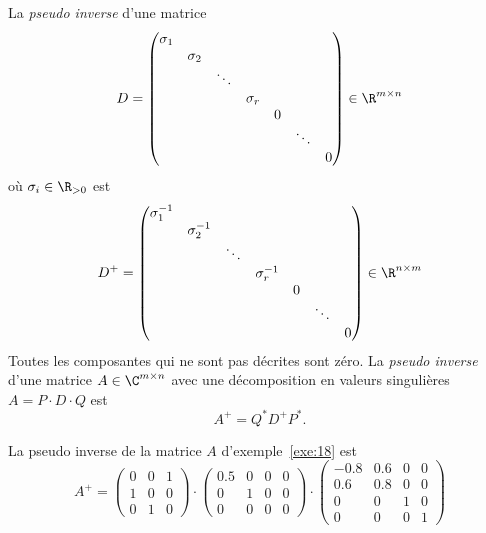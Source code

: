 \begin{definition}
  La \emph{pseudo inverse} d'une matrice 
  \begin{displaymath}
    D =
    \begin{pmatrix}
      \sigma_1 \\
      & \sigma_2 \\
      & & \ddots \\
      & & & \sigma_r \\
      & & & & 0 \\
      & & & & & \ddots  \\
      & & & & & & 0  \\      
    \end{pmatrix}
    \in \R^{m \times n}
  \end{displaymath}
où $\sigma_i \in \R_{>0}$ est 
\begin{displaymath}
  D^+ =  \begin{pmatrix}
      \sigma_1^{-1} \\
      & \sigma_2^{-1} \\
      & & \ddots \\
      & & & \sigma_r^{-1} \\
      & & & & 0 \\
      & & & & & \ddots  \\
      & & & & & & 0  \\      
    \end{pmatrix}
    \in \R^{n \times m}
\end{displaymath}
Toutes les composantes qui ne sont pas décrites sont zéro. 
La \emph{pseudo inverse} d'une matrice $A \in \C^{m \times n}$ avec une décomposition en valeurs singulières $A = P \cdot D \cdot Q$ est 
\begin{displaymath}
  A^+ = Q^* D^+ P^*. 
\end{displaymath}

\end{definition}


\begin{example}
  La pseudo inverse de la matrice $A$ d'exemple~\ref{exe:18} est 
  \begin{displaymath}
    A^+ = 
\begin{pmatrix}0 & 0 & 1\\1 & 0 & 0\\0 & 1 & 0\end{pmatrix} \cdot 
\begin{pmatrix}0.5 & 0 & 0 & 0\\0 & 1 & 0 & 0\\0 & 0 & 0 & 0\end{pmatrix}
\cdot
\begin{pmatrix}-0.8 & 0.6 & 0 & 0\\0.6 & 0.8 & 0 & 0\\0 & 0 & 1 & 0\\0 & 0 & 0 & 1\end{pmatrix} 
  \end{displaymath}
\end{example}

